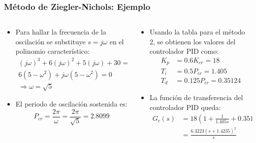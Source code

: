 \documentclass[aspectratio=169]{beamer}
\theoremstyle{definition}
\theoremstyle{plain}
\theoremstyle{remark}
\begin{document}
\begin{frame}[<+->]\frametitle{Método de Ziegler-Nichols: Ejemplo}
\begin{columns}
\begin{column}{0.5\textwidth}
\small
\begin{itemize}
	\item Para hallar la frecuencia de la oscilación se substituye $s = j\omega$ en el polinomio característico:
	\begin{align*}
		(j\omega)^3 + 6(j\omega)^2 + 5(j\omega) + 30 = 0\\
		6(5 - \omega^2) + j\omega(5-\omega^2) = 0\\
		\Rightarrow \omega = \sqrt{5}
	\end{align*}
	\item El periodo de oscilación sostenida es:
	\begin{equation*}
		P_{cr} = \frac{2\pi}{\omega} = \frac{2\pi}{\sqrt{5}} = 2.8099
	\end{equation*}
\end{itemize}
\end{column}
\begin{column}{0.5\textwidth}
\small
\begin{itemize}
	\item Usando la tabla para el método 2, se obtienen los valores del controlador PID como:
	\begin{align*}
		K_p &= 0.6 K_{cr} = 18\\
		T_i &= 0.5 P_{cr} = 1.405\\
		T_d &= 0.125P_{cr} = 0.35124
	\end{align*}
	\item La función de transferencia del controlador PID queda:
	\begin{align*}
		G_c(s) &= 18 \left( 1 + \frac{1}{1.405s} + 0.35124 s \right)\\
		&= \frac{6.3223(s+1.4235)^2}{s}
	\end{align*}
\end{itemize}
\end{column}
\end{columns}
\end{frame}
\end{document}
